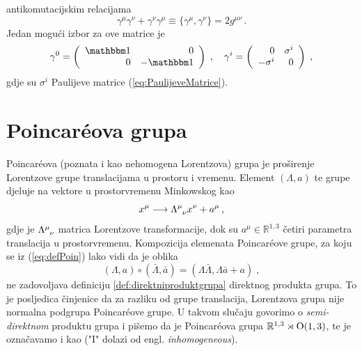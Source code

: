 antikomutacijskim relacijama  
\begin{equation}
 \gamma^\mu\gamma^\nu + \gamma^\nu \gamma^\mu
\equiv \{\gamma^\mu, \gamma^\nu\} = 2 g^{\mu\nu} \,.
\label{eq:DiracGamma}
\end{equation}
Jedan mogući izbor za ove matrice je
\begin{equation}
\gamma^0 = \left(\begin{array}{rr} \Eins & 0 \\
                        0 & -\Eins \end{array}\right)
\;, \quad
\gamma^i = \left(\begin{array}{rr} 0 & \sigma^i \\
                        -\sigma^i & 0 \end{array}\right) \;,
\end{equation}
gdje su $\sigma^i$ Paulijeve matrice (\ref{eq:PaulijeveMatrice}).

\section{Poincar\'{e}ova grupa}

Poincar\'{e}ova (poznata i kao nehomogena Lorentzova) grupa je
proširenje Lorentzove grupe translacijama u prostoru
i vremenu. Element $(\Lambda, a)$ te grupe djeluje na vektore u prostorvremenu
Minkowskog kao
\begin{equation}
  x^\mu \longrightarrow \tensor{\Lambda}{^\mu_\nu} x^\nu + a^\mu \,,
\label{eq:defPoin}
\end{equation}
gdje je $\tensor{\Lambda}{^\mu_\nu}$ matrica Lorentzove transformacije,
dok su $a^\mu \in \mathbb{R}^{1,3}$ četiri parametra translacija u prostorvremenu.
Kompozicija elemenata Poincar\'{e}ove grupe, za koju se iz (\ref{eq:defPoin}) 
lako vidi da je oblika
\begin{equation}
    (\Lambda, a) \circ (\bar{\Lambda}, \bar{a})
    = (\Lambda \bar{\Lambda}, \Lambda\bar{a} + a) \;,
\end{equation}
ne zadovoljava definiciju \ref{def:direktniproduktgrupa} direktnog produkta
grupa. To je posljedica činjenice da za razliku od grupe translacija,
Lorentzova grupa nije normalna podgrupa Poincar\'{e}ove grupe.
U takvom slučaju govorimo o \emph{semi-direktnom} produktu grupa
i pišemo da je Poincar\'{e}ova grupa $\mathbb{R}^{1,3} \rtimes \mathrm{O}(1,3)$,
te je označavamo i kao  ("I" dolazi od engl. \emph{inhomogeneous}).

